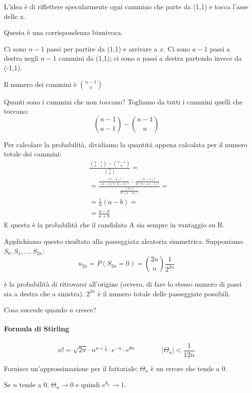 \documentclass[a4paper,12pt]{book}
\newcommand\ddfrac[2]{\frac{\displaystyle #1}{\displaystyle #2}}
\begin{document}
L'idea è di riflettere specularmente ogni cammino che parte da (1,1) e tocca l'asse delle x.

Questa è una corrispondenza biunivoca. 

Ci sono $ n-1 $ passi per partire da (1,1) e arrivare a $ x $. Ci sono $ a-1 $ passi a destra negli $ n-1 $ cammini da (1,1); ci sono $ a $ passi a destra partendo invece da (-1,1).

Il numero dei cammini è $ \binom{n-1}{a} $

Quanti sono i cammini che non toccano? Togliamo da tutti i cammini quelli che toccano:
$$\binom{n-1}{a-1} - \binom{n-1}{a}$$

Per calcolare la probabilità, dividiamo la quantità appena calcolata per il numero totale dei cammini:
\begin{align*}
 & \ddfrac{\binom{n-1}{a-1} - \binom{n-1}{a}}{\binom{n}{a}} = \\
 & = \ddfrac{\frac{(n-1)!}{(a-1)!(n-a)!} - \frac{(n-1)!}{a!(n-a-1)!}}{\frac{(n)!}{a!(n-a)!}} = \\
 & = \frac{1}{n}(a-b) = \\
 & = \frac{a-b}{a+b}
\end{align*}
E questa è la probabilità che il candidato A sia sempre in vantaggio su B. 

Applichiamo questo risultato alla passeggiata aleatoria simmetrica. 
Supponiamo $ S_0, S_1, ..., S_{2n} $:
$$u_{2n} = P(S_{2n} = 0 ) = \binom{2n}{n}\frac{1}{2^{2n}}$$

è la probabilità di ritrovarsi all'origine (ovvero, di fare lo stesso numero di passi sia a destra che a sinistra). $ 2^{2n} $ è il numero totale delle passeggiate possibili. 

Cosa succede quando $ n $ cresce?

\begin{tcolorbox}
	\paragraph{Formula di Stirling} 
	$$ n! = \sqrt{2\pi}\cdot n^{n+\frac{1}{2}} \cdot e^{-n} \cdot e^{\theta n} \qquad \qquad |\Theta_n| < \frac{1}{12n}$$
	
	Fornisce un'approssimazione per il fattoriale; $ \Theta_n $ è un errore che tende a 0. 
	
	Se $ n $ tende a 0, $ \Theta_n \rightarrow 0 $ e quindi $ e^{\theta_n} \rightarrow 1 $.
	
\end{tcolorbox}
\end{document}
